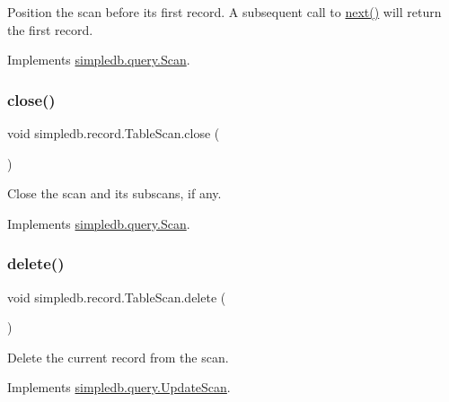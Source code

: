 Position the scan before its first record. A subsequent call to \hyperlink{classsimpledb_1_1record_1_1TableScan_aefc2187ef691253a8d569d01f423c18b}{next()} will return the first record. 

Implements \hyperlink{interfacesimpledb_1_1query_1_1Scan_a2eceb634b69da9bf1269a4355808cc6b}{simpledb.\+query.\+Scan}.

\mbox{\label{classsimpledb_1_1record_1_1TableScan_aff0239675c54b7e5d7c72695a7169c7c}} 
\subsubsection{\texorpdfstring{close()}{close()}}
{\footnotesize\ttfamily void simpledb.\+record.\+Table\+Scan.\+close (\begin{DoxyParamCaption}{ }\end{DoxyParamCaption})\hspace{0.3cm}{\ttfamily [inline]}}

Close the scan and its subscans, if any. 

Implements \hyperlink{interfacesimpledb_1_1query_1_1Scan_a260f40a8c82edaa00398bea9d698933c}{simpledb.\+query.\+Scan}.

\mbox{\label{classsimpledb_1_1record_1_1TableScan_a6797bdf6cdf1cd9f73cb86b32ac339d7}} 
\subsubsection{\texorpdfstring{delete()}{delete()}}
{\footnotesize\ttfamily void simpledb.\+record.\+Table\+Scan.\+delete (\begin{DoxyParamCaption}{ }\end{DoxyParamCaption})\hspace{0.3cm}{\ttfamily [inline]}}

Delete the current record from the scan. 

Implements \hyperlink{interfacesimpledb_1_1query_1_1UpdateScan_a503723e6287a2ea9ce73375f70a5e819}{simpledb.\+query.\+Update\+Scan}.

